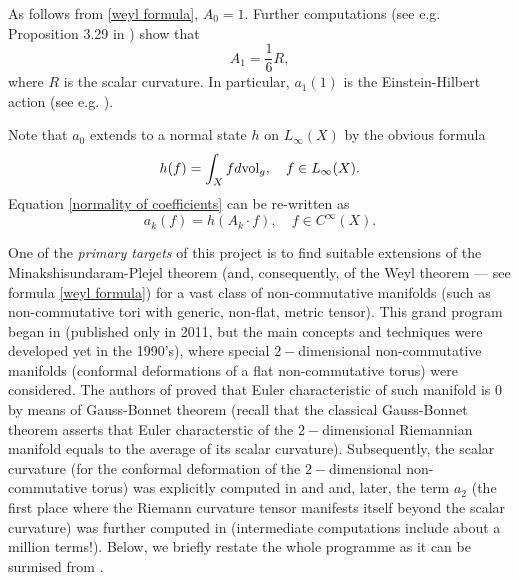\documentclass[12pt]{article}
\begin{document}
As follows from \eqref{weyl formula}, $A_0=1.$ Further computations (see e.g. Proposition 3.29 in \cite{Rosenberg}) show that
$$A_1=\frac16 R,$$
where $R$ is the scalar curvature. In particular, $a_1(1)$ is the Einstein-Hilbert action (see e.g. \cite{Connes-book}).

Note that $a_0$ extends to a normal state $h$ on $L_{\infty}(X)$ by the obvious formula
$$h(f)=\int_X fd{\rm vol}_g,\quad f\in L_{\infty}(X).$$
Equation \eqref{normality of coefficients} can be re-written as
$$a_k(f)=h(A_k\cdot f),\quad f\in C^{\infty}(X).$$

One of the {\it primary targets} of this project is to find suitable extensions of the Minakshisundaram-Plejel theorem (and, consequently, of the Weyl theorem --- see formula \eqref{weyl formula}) for a vast class of non-commutative manifolds (such as non-commutative tori with generic, non-flat, metric tensor). This grand program began in \cite{ConnesTretkoff} (published only in 2011, but the main concepts and techniques were developed yet in the 1990's), where special $2-$dimensional non-commutative manifolds (conformal deformations of a flat non-commutative torus) were considered. The authors of \cite{ConnesTretkoff} proved that Euler characteristic of such manifold is $0$ by means of Gauss-Bonnet theorem (recall that the classical Gauss-Bonnet theorem asserts that Euler characterstic of the $2-$dimensional Riemannian manifold equals to the average of its scalar curvature). Subsequently, the scalar curvature (for the conformal deformation of the $2-$dimensional non-commutative torus) was explicitly computed in \cite{ConnesMoscovici_curvature} and \cite{FathizadehKhalkhali} and, later, the term $a_2$ (the first place where the Riemann curvature tensor manifests itself beyond the scalar curvature) was further computed in \cite{ConnesFathizadeh} (intermediate computations include about a million terms!). Below, we briefly restate the whole programme as it can be surmised from \cite{ConnesTretkoff}.


\end{document}

